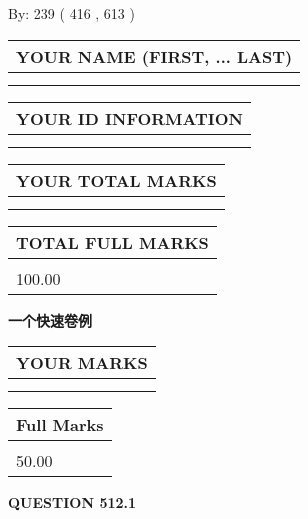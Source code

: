 \documentclass{ctexart}
\begin{document}
   
\hspace{1.0in} By: 
 239 ( 416 ,  613 )
   
   
   
   
\newpage 
\setcounter{page}{ 
   512001 } 
   
   
   
   
\noindent\begin{tabular}{|l|}
\hline
YOUR NAME (FIRST, ... LAST)  \\
\hline
 \\ 
 \\ 
\hline
\end{tabular}
\hspace{0.05in} \begin{tabular}{|l|}
\hline
 YOUR   ID   INFORMATION  \\
\hline
 \\ 
 \\ 
\hline
\end{tabular}
   
   
\vspace{0.2in}\noindent\begin{tabular}{|l|}
\hline
YOUR TOTAL MARKS  \\
\hline
 \\ 
 \\ 
\hline
\end{tabular}
\hspace{0.05in} \begin{tabular}{|l|}
\hline
TOTAL FULL MARKS  \\
\hline
 \\ 
100.00 \\
\hline
\end{tabular}
   
   
 \vspace{0.2in}
{\LARGE {\textbf{ 一个快速卷例}}}
   
   
  
\vspace{0.2in}
  
\noindent\begin{tabular}{|l|}
\hline
 YOUR MARKS  \\
\hline
 \\ 
 \\ 
\hline
\end{tabular}
\hspace{0.05in} \begin{tabular}{|l|}
\hline
 Full Marks  \\
\hline
 \\ 
50.00 \\
\hline
\end{tabular}
{\textbf{\Large{QUESTION
512.1 
}}}
  
\end{document}
